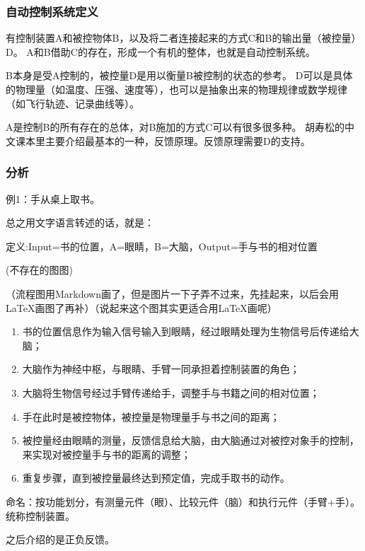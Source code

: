 \documentclass{NHNotebook}
\begin{document}
\subsubsection{自动控制系统定义}
有控制装置A和被控物体B，以及将二者连接起来的方式C和B的输出量（被控量）D。
A和B借助C的存在，形成一个有机的整体，也就是自动控制系统。

B本身是受A控制的，被控量D是用以衡量B被控制的状态的参考。
D可以是具体的物理量（如温度、压强、速度等），也可以是抽象出来的物理规律或数学规律（如飞行轨迹、记录曲线等）。

A是控制B的所有存在的总体，对B施加的方式C可以有很多很多种。
胡寿松的中文课本里主要介绍最基本的一种，反馈原理。反馈原理需要D的支持。
\subsubsection{分析}
例1：手从桌上取书。

总之用文字语言转述的话，就是：

定义:Input=书的位置，A=眼睛，B=大脑，Output=手与书的相对位置

    (不存在的图图)%
    
    （流程图用Markdown画了，但是图片一下子弄不过来，先挂起来，以后会用LaTeX画图了再补）（说起来这个图其实更适合用\LaTeX 画呢）

\begin{enumerate}    
    \item 书的位置信息作为输入信号输入到眼睛，经过眼睛处理为生物信号后传递给大脑；
    \item 大脑作为神经中枢，与眼睛、手臂一同承担着控制装置的角色；
    \item 大脑将生物信号经过手臂传递给手，调整手与书籍之间的相对位置；
    \item 手在此时是被控物体，被控量是物理量手与书之间的距离；
    \item 被控量经由眼睛的测量，反馈信息给大脑，由大脑通过对被控对象手的控制，来实现对被控量手与书的距离的调整；
    \item 重复步骤，直到被控量最终达到预定值，完成手取书的动作。
\end{enumerate}

命名：按功能划分，有测量元件（眼）、比较元件（脑）和执行元件（手臂+手）。统称控制装置。

之后介绍的是正负反馈。
\end{document}
